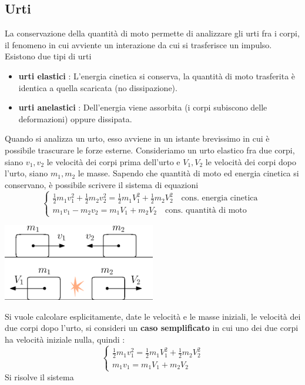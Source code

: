 \documentclass[10pt, letterpaper]{report}
\begin{document}
\subsection{Urti}
La conservazione della quantità di moto permette di analizzare 
gli urti fra i corpi, il fenomeno in cui avviente un interazione da cui 
si trasferisce un impulso. Esistono due tipi di urti\begin{itemize}
    \item \textbf{urti elastici} : L'energia cinetica si conserva, la quantità di 
    moto trasferita è identica a quella scaricata (no dissipazione). 
    \item \textbf{urti anelastici} : Dell'energia viene assorbita (i corpi 
    subiscono delle deformazioni) oppure dissipata.
\end{itemize}
Quando si analizza un urto, esso avviene in un istante brevissimo in 
cui è possibile 
trascurare le forze esterne. Consideriamo un urto elastico fra due 
corpi, siano $v_1,v_2$ le velocità dei corpi prima dell'urto e 
$V_1,V_2$ le velocità dei corpi dopo l'urto, siano $m_1,m_2$ le masse. Sapendo che quantità di moto ed 
energia cinetica si conservano, è possibile scrivere il sistema di equazioni 
$$ \begin{cases}
    \frac{1}{2}m_1v_1^2+\frac{1}{2}m_2v_2^2 =  \frac{1}{2}m_1V_1^2+\frac{1}{2}m_2V_2^2   \ \ \ \text{ cons. energia cinetica }\\
    m_1v_1-m_2v_2 = m_1V_1+m_2V_2 \ \ \ \text{ cons. quantità di moto }
\end{cases}$$
\begin{center}
    \includegraphics[width=0.5\textwidth ]{images/urti.eps}
\end{center}
Si vuole calcolare esplicitamente, date le velocità e le masse iniziali, le 
velocità dei due corpi dopo l'urto, si consideri un \textbf{caso semplificato} 
in cui uno dei due corpi ha velocità iniziale nulla, quindi : 
$$ \begin{cases}
    \frac{1}{2}m_1v_1^2=   \frac{1}{2}m_1V_1^2+\frac{1}{2}m_2V_2^2 \\
    m_1v_1 = m_1V_1+m_2V_2 
\end{cases}$$
Si risolve il sistema 
\end{document}
